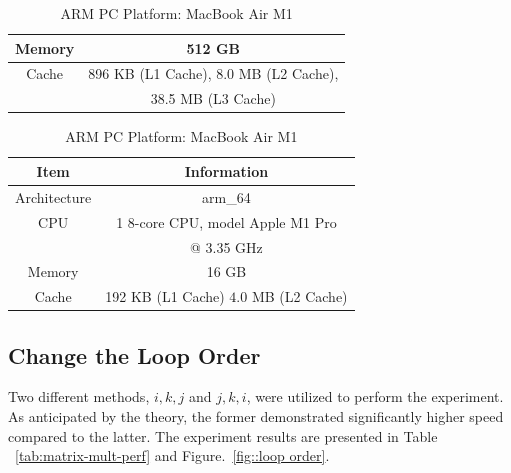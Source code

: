 \documentclass[conference]{IEEEtran}
\begin{document}
\begin{table}[htbp]
\begin{minipage}[t]{\linewidth}
\begin{tabular}{|c|c|}
	 			Memory & 512 GB \\ \hline
	 			Cache & 896 KB (L1 Cache), 8.0 MB (L2 Cache), \\ 
	 			& 38.5 MB (L3 Cache) \\ \hline
	 		\end{tabular}
	 	\end{minipage}	
 		\hspace{\linewidth}
 		\begin{minipage}[t]{\linewidth}
 			\centering
 			\caption{ARM PC Platform: MacBook Air M1}
 			\label{tab:system_config3}
 			\setlength\extrarowheight{2pt}
 			\begin{tabular}{|c|c|}
 				\hline
 				Item & Information \\ \hline
 				Architecture & arm\_64 \\ \hline
 				CPU & 1 $8$-core CPU, model Apple M1 Pro \\ 
 				& @ 3.35 GHz \\ \hline
 				Memory & 16 GB \\ \hline
 				Cache & 192 KB (L1 Cache) $4.0$ MB (L2 Cache) \\ \hline
 			\end{tabular}
 		\end{minipage}	
	\end{table}

	
	\subsection{Change the Loop Order}
	
	Two different methods, $i,k,j$ and $j,k,i$, were utilized to perform the experiment. As anticipated by the theory, the former demonstrated significantly higher speed compared to the latter. The experiment results are presented in Table ~\ref{tab:matrix-mult-perf} and Figure.~\ref{fig::loop order}.
	
\end{document}
